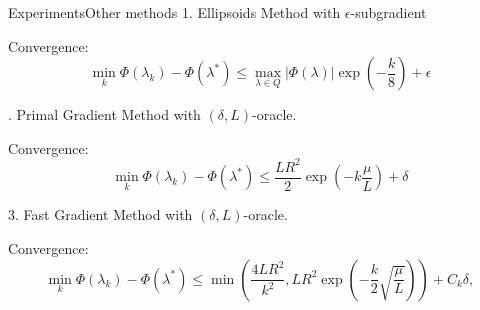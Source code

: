 \documentclass{beamer}
\begin{document}
\begin{frame}{Experiments}{Other methods}
1. Ellipsoids Method with $\epsilon$-subgradient

Convergence:$$\min_k\Phi(\lambda_k) - \Phi(\lambda^*)\leq \max_{\lambda\in Q}|\Phi(\lambda)|\exp\left(-\frac{k}{8}\right) + \epsilon$$

. Primal Gradient Method with $(\delta,L)$-oracle.

Convergence:$$\min_k\Phi(\lambda_k) - \Phi(\lambda^*)\leq \frac{LR^2}{2}\exp\left(-k\frac{\mu}{L}\right) + \delta$$

\pause

3. Fast Gradient Method with $(\delta,L)$-oracle.

Convergence:$$\min_k\Phi(\lambda_k) - \Phi(\lambda^*)\leq \min\left(\frac{4LR^2}{k^2}, LR^2\exp\left(-\frac{k}{2}\sqrt{\frac{\mu}{L}}\right)\right) + C_k\delta,$$
\end{frame}
\end{document}
